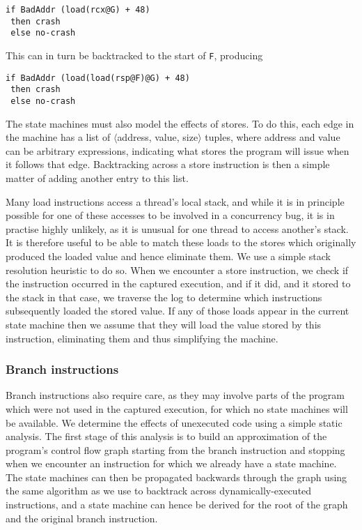 \documentclass[10pt,twocolumn,preprint,natbib,authoryear]{sigplanconf}
\newcommand{\editorial}[1]{}
\begin{document}
\begin{verbatim}
if BadAddr (load(rcx@G) + 48)
 then crash
 else no-crash
\end{verbatim}

This can in turn be backtracked to the start of \verb|F|, producing

\begin{verbatim}
if BadAddr (load(load(rsp@F)@G) + 48)
 then crash
 else no-crash
\end{verbatim}

The state machines must also model the effects of stores.  To do this,
each edge in the machine has a list of $\langle{}$address, value,
size$\rangle{}$ tuples, where address and value can be arbitrary
expressions, indicating what stores the program will issue when it
follows that edge.  Backtracking across a store instruction is then a
simple matter of adding another entry to this list.\editorial{I used
  to have a bit about dropping deep loads, but having run the
  experiments, it turns out that really doesn't matter.  Which is odd,
  because it used to be a major optimization, but I guess some of the
  improvements to the alias resolution stuff must have obviated it.}

Many load instructions access a thread's local stack, and while it is
in principle possible for one of these accesses to be involved in a
concurrency bug, it is in practise highly unlikely, as it is unusual
for one thread to access another's stack.  It is therefore useful to
be able to match these loads to the stores which originally produced
the loaded value and hence eliminate them.  We use a simple stack
resolution heuristic to do so.  When we encounter a store instruction,
we check if the instruction occurred in the captured execution, and if
it did, and it stored to the stack in that case, we traverse the log
to determine which instructions subsequently loaded the stored value.
If any of those loads appear in the current state machine then we
assume that they will load the value stored by this instruction,
eliminating them and thus simplifying the machine.\editorial{Would
  also benefit from some eval.}

\subsubsection{Branch instructions}
\label{sect:branch_instrs}
Branch instructions also require care, as they may involve parts of
the program which were not used in the captured execution, for which
no state machines will be available.  We determine the effects of
unexecuted code using a simple static analysis.  The first stage of
this analysis is to build an approximation of the program's control
flow graph starting from the branch instruction and stopping when we
encounter an instruction for which we already have a state machine.
The state machines can then be propagated backwards through the graph
using the same algorithm as we use to backtrack across
dynamically-executed instructions, and a state machine can hence be
derived for the root of the graph and the original branch instruction.
\end{document}
